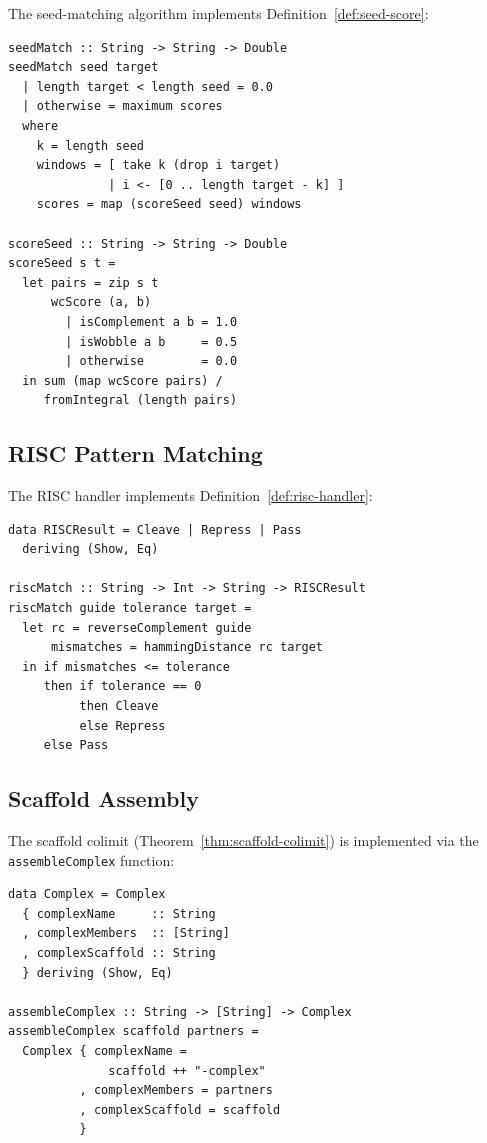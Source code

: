 \documentclass[12pt,a4paper]{article}
\theoremstyle{definition}
\begin{document}
The seed-matching algorithm implements Definition~\ref{def:seed-score}:

\begin{lstlisting}
seedMatch :: String -> String -> Double
seedMatch seed target
  | length target < length seed = 0.0
  | otherwise = maximum scores
  where
    k = length seed
    windows = [ take k (drop i target)
              | i <- [0 .. length target - k] ]
    scores = map (scoreSeed seed) windows

scoreSeed :: String -> String -> Double
scoreSeed s t =
  let pairs = zip s t
      wcScore (a, b)
        | isComplement a b = 1.0
        | isWobble a b     = 0.5
        | otherwise        = 0.0
  in sum (map wcScore pairs) /
     fromIntegral (length pairs)
\end{lstlisting}

\subsection{RISC Pattern Matching}

The RISC handler implements Definition~\ref{def:risc-handler}:

\begin{lstlisting}
data RISCResult = Cleave | Repress | Pass
  deriving (Show, Eq)

riscMatch :: String -> Int -> String -> RISCResult
riscMatch guide tolerance target =
  let rc = reverseComplement guide
      mismatches = hammingDistance rc target
  in if mismatches <= tolerance
     then if tolerance == 0
          then Cleave
          else Repress
     else Pass
\end{lstlisting}

\subsection{Scaffold Assembly}

The scaffold colimit (Theorem~\ref{thm:scaffold-colimit}) is
implemented via the \texttt{assembleComplex} function:

\begin{lstlisting}
data Complex = Complex
  { complexName     :: String
  , complexMembers  :: [String]
  , complexScaffold :: String
  } deriving (Show, Eq)

assembleComplex :: String -> [String] -> Complex
assembleComplex scaffold partners =
  Complex { complexName =
              scaffold ++ "-complex"
          , complexMembers = partners
          , complexScaffold = scaffold
          }
\end{lstlisting}
\end{document}
